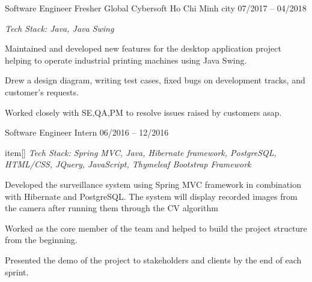 \begin{cventries}
  \cventry
    {Software Engineer Fresher} %
    {Global Cybersoft} %
    {Ho Chi Minh city} %
    {07/2017 -- 04/2018} %
    {
      \begin{cvitems} %
        \item[] {\it Tech Stack: Java, Java Swing}
        \item {Maintained and developed new features for the desktop application project helping to operate industrial printing machines using Java Swing.}
        \item {Drew a design diagram, writing test cases, fixed bugs on development tracks, and customer’s requests.}
        \item{Worked closely with SE,QA,PM to resolve issues raised by customers asap.}
      \end{cvitems}
    }

    \cventry
    {Software Engineer Intern} %
    {} %
    {} %
    {06/2016 -- 12/2016} %
    {
      \begin{cvitems} %
        item[] {\it Tech Stack: Spring MVC, Java, Hibernate framework, PostgreSQL, HTML/CSS, JQuery, JavaScript, Thymeleaf Bootstrap Framework}
        \item {Developed the surveillance system using Spring MVC framework in combination with Hibernate and PostgreSQL. The system will display recorded images from the camera after running them through the CV algorithm}
        \item {Worked as the core member of the team and helped to build the project structure from the beginning.}
        \item{Presented the demo of the project to stakeholders and clients by the end of each sprint.}
      \end{cvitems}
    }

\end{cventries}
